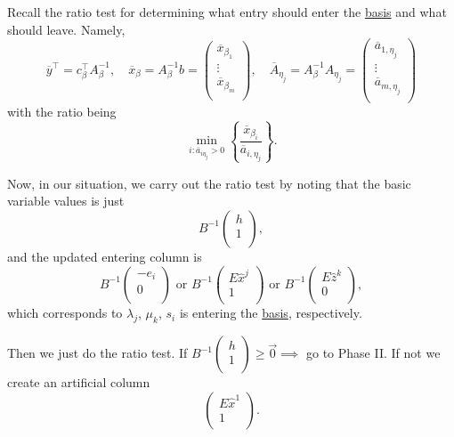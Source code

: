 Recall the ratio test for determining what entry should enter the \hyperref[def:basic]{basis} and what should leave. Namely,
\[
	\overline{y}^{\top} = c_{\beta}^{\top} A_{\beta}^{-1},\quad \overline{x}_{\beta} = A_{\beta}^{-1} b = \begin{pmatrix}
		\overline{x}_{\beta_1} \\
		\vdots                 \\
		\overline{x}_{\beta_m} \\
	\end{pmatrix}, \quad \overline{A}_{\eta_{j}} = A_{\beta}^{-1} A_{\eta_{j}} = \begin{pmatrix}
		\overline{a}_{1, \eta_{j}} \\
		\vdots                     \\
		\overline{a}_{m, \eta_{j}} \\
	\end{pmatrix}
\]
with the ratio being
\[
	\min_{i\colon \overline{a}_{i\eta_{j}}>0}\left\{\frac{\overline{x}_{\beta_{i}}}{\overline{a}_{i, \eta_{j}}}\right\}.
\]

Now, in our situation, we carry out the ratio test by noting that the basic variable values is just
\[
	B^{-1}\begin{pmatrix}
		h \\
		1 \\
	\end{pmatrix},
\]
and the updated entering column is
\[
	B^{-1} 	\begin{pmatrix}
		-e_{i} \\
		0      \\
	\end{pmatrix} \text{ or } B^{-1}\begin{pmatrix}
		E \hat{x}^j \\
		1           \\
	\end{pmatrix} \text{ or } B^{-1}\begin{pmatrix}
		E \hat{z}^k \\
		0           \\
	\end{pmatrix},
\]
which corresponds to \(\lambda_{j}\), \(\mu_k\), \(s_{i}\) is entering the \hyperref[def:basic]{basis}, respectively.

Then we just do the ratio test. If \(B^{-1}\begin{pmatrix}
	h \\
	1 \\
\end{pmatrix}\geq \vec{0}\implies\) go to Phase II. If not we create an artificial column
\[
	\begin{pmatrix}
		E\hat{x}^1 \\
		1          \\
	\end{pmatrix}.
\]